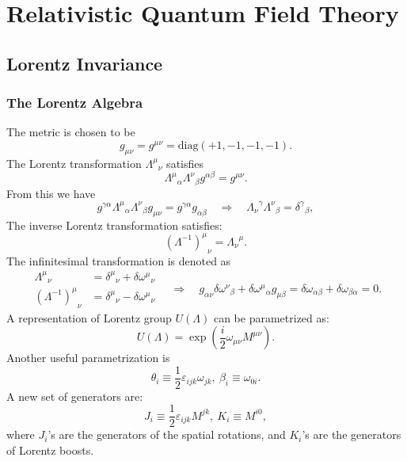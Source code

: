 \chapter{Relativistic Quantum Field Theory}

\section{Lorentz Invariance}

\subsection{The Lorentz Algebra}
The metric is chosen to be 
\begin{equation}
	g_{\mu\nu}=g^{\mu\nu}=\mathrm{diag}(+1,-1,-1,-1).
\end{equation}
The Lorentz transformation ${\Lambda^{\mu}}_{\nu}$ satisfies
\begin{equation}
{\Lambda^{\mu}}_{\alpha}{\Lambda^{\nu}}_{\beta} g^{\alpha\beta} = g^{\mu\nu}.
\end{equation}
From this we have
\begin{equation*}
	g^{\gamma\alpha}{\Lambda^{\mu}}_{\alpha}{\Lambda^{\nu}}_{\beta} g_{\mu\nu} 
	= g^{\gamma\alpha}g_{\alpha\beta} 
	\quad \Longrightarrow \quad
	{\Lambda_{\nu}}^{\gamma}{\Lambda^{\nu}}_{\beta} 
	= {\delta^{\gamma}}_{\beta},
\end{equation*}
The inverse Lorentz transformation satisfies:
\begin{equation}
	{(\Lambda^{-1})^{\mu}}_{\nu} = {\Lambda_{\nu}}^{\mu}.
\end{equation}
The infinitesimal transformation is denoted as
\begin{equation*}
\begin{aligned}
	{\Lambda^{\mu}}_{\nu} &= {\delta^{\mu}}_{\nu}+\delta{\omega^{\mu}}_{\nu} \\
	{(\Lambda^{-1})^\mu}_\nu &= {\delta^{\mu}}_{\nu}-\delta{\omega^\mu}_\nu
\end{aligned}
	\quad \Longrightarrow \quad
	g_{\alpha\nu}\delta{\omega^{\nu}}_{\beta}+\delta{\omega^{\mu}}_{\alpha}g_{\mu\beta}
	=\delta\omega_{\alpha\beta} + \delta\omega_{\beta\alpha} = 0.
\end{equation*}
A representation of Lorentz group $U(\Lambda)$ can be parametrized as:
\begin{equation}
	U(\Lambda) = \exp\left(\frac{i}{2}\omega_{\mu\nu}M^{\mu\nu}\right).
\end{equation}
Another useful parametrization is
\begin{equation}
	\theta_i \equiv \frac{1}{2}\varepsilon_{ijk}\omega_{jk}, \ 
	\beta_i \equiv \omega_{0i}.
\end{equation}
A new set of generators are:
\begin{equation}
	J_i \equiv \frac{1}{2}\varepsilon_{ijk}M^{jk},\ 
	K_i \equiv M^{i0},
\end{equation}
where $J_i$'s are the generators of the spatial rotations, and $K_i$'s are the generators of Lorentz boosts.

